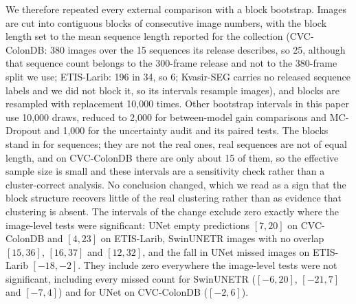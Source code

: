 We therefore repeated every external comparison with a block bootstrap. Images are cut into contiguous blocks of consecutive image numbers, with the block length set to the mean sequence length reported for the collection (CVC-ColonDB: 380 images over the 15 sequences its release describes, so 25, although that sequence count belongs to the 300-frame release and not to the 380-frame split we use; ETIS-Larib: 196 in 34, so 6; Kvasir-SEG carries no released sequence labels and we did not block it, so its intervals resample images), and blocks are resampled with replacement 10,000 times. Other bootstrap intervals in this paper use 10,000 draws, reduced to 2,000 for between-model gain comparisons and MC-Dropout and 1,000 for the uncertainty audit and its paired tests. The blocks stand in for sequences; they are not the real ones, real sequences are not of equal length, and on CVC-ColonDB there are only about 15 of them, so the effective sample size is small and these intervals are a sensitivity check rather than a cluster-correct analysis. No conclusion changed, which we read as a sign that the block structure recovers little of the real clustering rather than as evidence that clustering is absent. The intervals of the change exclude zero exactly where the image-level tests were significant: UNet empty predictions $[7, 20]$ on CVC-ColonDB and $[4, 23]$ on ETIS-Larib, SwinUNETR images with no overlap $[15, 36]$, $[16, 37]$ and $[12, 32]$, and the fall in UNet missed images on ETIS-Larib $[-18, -2]$. They include zero everywhere the image-level tests were not significant, including every missed count for SwinUNETR ($[-6, 20]$, $[-21, 7]$ and $[-7, 4]$) and for UNet on CVC-ColonDB ($[-2, 6]$).

